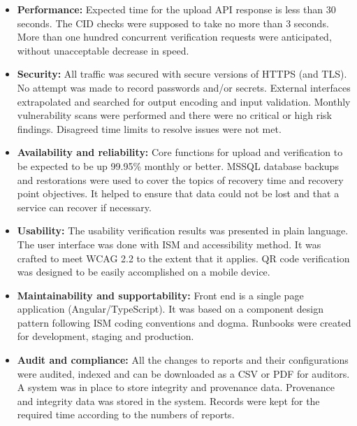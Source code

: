 \begin{itemize}
    \item \textbf{Performance:} Expected time for the upload API response is less than 30 seconds. The CID checks were supposed to take no more than 3 seconds. More than one hundred concurrent verification requests were anticipated, without unacceptable decrease in speed.

    \item \textbf{Security:} All traffic was secured with secure versions of HTTPS (and TLS). No attempt was made to record passwords and/or secrets. External interfaces extrapolated and searched for output encoding and input validation. Monthly vulnerability scans were performed and there were no critical or high risk findings. Disagreed time limits to resolve issues were not met.

    \item \textbf{Availability and reliability:} Core functions for upload and verification to be expected to be up 99.95\% monthly or better. MSSQL database backups and restorations were used to cover the topics of recovery time and recovery point objectives. It helped to ensure that data could not be lost and that a service can recover if necessary.

    \item \textbf{Usability:} The usability verification results was presented in plain language. The user interface was done with ISM and accessibility method. It was crafted to meet WCAG 2.2 to the extent that it applies. QR code verification was designed to be easily accomplished on a mobile device.

    \item \textbf{Maintainability and supportability:} Front end is a single page application (Angular/TypeScript). It was based on a component design pattern following ISM coding conventions and dogma. Runbooks were created for development, staging and production.

    \item \textbf{Audit and compliance:} All the changes to reports and their configurations were audited, indexed and can be downloaded as a CSV or PDF for auditors. A system was in place to store integrity and provenance data. Provenance and integrity data was stored in the system. Records were kept for the required time according to the numbers of reports.
\end{itemize}

\clearpage




